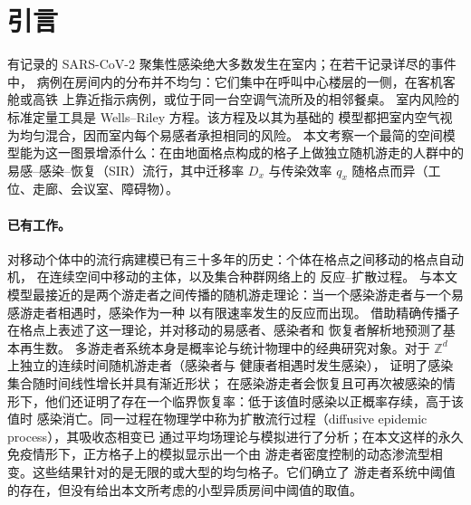\section{引言}\label{s1_intro:sec}

有记录的 SARS-CoV-2 聚集性感染绝大多数发生在室内\citep{qian2021indoor,leclerc2020settings}；在若干记录详尽的事件中，
病例在房间内的分布并不均匀：它们集中在呼叫中心楼层的一侧\citep{park2020}，在客机客舱\citep{khanh2020}或高铁
\citep{hu2021}上靠近指示病例，或位于同一台空调气流所及的相邻餐桌\citep{lu2020,li2021}。
室内风险的标准定量工具是 Wells--Riley 方程\citep{wells1955airborne,riley1978,szeto2010review}。该方程及以其为基础的
模型\citep{noakes2006modelling,bazant2021guideline}都把室内空气视为均匀混合，因而室内每个易感者承担相同的风险。
本文考察一个最简的空间模型能为这一图景增添什么：在由地面格点构成的格子上做独立随机游走的人群中的
易感–感染–恢复（SIR）流行，其中迁移率 $D_x$ 与传染效率 $q_x$ 随格点而异（工位、走廊、会议室、障碍物）。

\paragraph{已有工作。}
对移动个体中的流行病建模已有三十多年的历史：个体在格点之间移动的格点自动机\citep{boccara1992automata,rhodes1996persistence}，
在连续空间中移动的主体\citep{gonzalez2004scaling,frasca2006dynamical,buscarino2008disease}，以及集合种群网络上的
反应–扩散过程\citep{colizza2007reaction,belik2011natural,wang2014spatial}。
与本文模型最接近的是两个游走者之间传播的随机游走理论：当一个感染游走者与一个易感游走者相遇时，感染作为一种
以有限速率发生的反应而出现\citep{kenkre2014theory,sugaya2018analysis,kenkre2021theory}。\citet{giuggioli2022spatio}
借助精确传播子\citep{giuggioli2020exact,sarvaharman2023particle}在格点上表述了这一理论，并对移动的易感者、感染者和
恢复者解析地预测了基本再生数。
多游走者系统本身是概率论与统计物理中的经典研究对象。对于 $\mathbb{Z}^d$ 上独立的连续时间随机游走者（感染者与
健康者相遇时发生感染），\citet{kesten2005spread,kesten2008shape} 证明了感染集合随时间线性增长并具有渐近形状；
在感染游走者会恢复且可再次被感染的情形下，他们还证明了存在一个临界恢复率：低于该值时感染以正概率存续，高于该值时
感染消亡\citep{kesten2006phase}。同一过程在物理学中称为扩散流行过程（diffusive epidemic process），其吸收态相变已
通过平均场理论与模拟进行了分析\citep{maia2007diffusive}；在本文这样的永久免疫情形下，正方格子上的模拟显示出一个由
游走者密度控制的动态渗流型相变\citep{carvalho2025generalized}。这些结果针对的是无限的或大型的均匀格子。它们确立了
游走者系统中阈值的存在，但没有给出本文所考虑的小型异质房间中阈值的取值。

